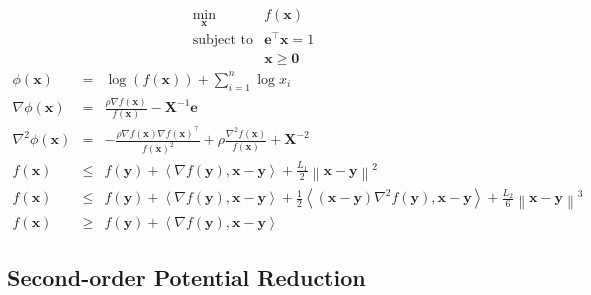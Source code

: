 \documentclass{article}
\newcommand{\x}{\mathbf{x}}
\newcommand{\0}{\textbf{0}}
\newcommand{\e}{\mathbf{e}}
\newcommand{\n}{\nabla}
\newcommand{\X}{\mathbf{X}}
\newcommand{\y}{\mathbf{y}}
\begin{document}
\begin{eqnarray*}
  \min_{\x} & f \left( \x \right) & \\
  \text{subject to} & \e^{\top} \x = 1 & \\
  & \x \geq \0 & 
\end{eqnarray*}
\begin{eqnarray*}
  \phi \left( \x \right) & = & \log \left( f \left( \x \right) \right) +
  \sum_{i = 1}^n \log x_i\\
  \n \phi \left( \x \right) & = & \frac{\rho \n f \left( \x \right)}{f \left(
  \x \right)} - \X^{- 1} \e\\
  \nabla^2 \phi \left( \x \right) & = & - \frac{\rho \n f \left( \x \right) \n
  f \left( \x \right)^{\top}}{f \left( \x \right)^2} + \rho \frac{\n^2 f
  \left( \x \right)}{f \left( \x \right)} + \X^{- 2}\\
  f \left( \x \right) & \leq & f \left( \y \right) + \left\langle \n f \left(
  \y \right), \x - \y \right\rangle + \frac{L_1}{2} \left\| \x - \y
  \right\|^2\\
  f \left( \x \right) & \leq & f \left( \y \right) + \left\langle \n f \left(
  \y \right), \x - \y \right\rangle + \frac{1}{2} \left\langle \left( \x - \y
  \right) \n^2 f \left( \y \right), \x - \y \right\rangle + \frac{L_2}{6}
  \left\| \x - \y \right\|^3\\
  f \left( \x \right) & \geq & f \left( \y \right) + \left\langle \n f \left(
  \y \right), \x - \y \right\rangle
\end{eqnarray*}

\subsection{Second-order Potential Reduction}
\end{document}
